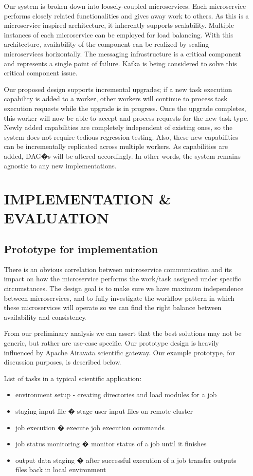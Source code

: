 \documentclass[sigconf]{acmart}
\begin{document}
Our system is broken down into loosely-coupled microservices. Each microservice performs closely related functionalities and gives away work to others. As this is a microservice inspired architecture, it inherently supports scalability. Multiple instances of each microservice can be employed for load balancing. With this architecture, availability of the component can be realized by scaling microservices horizontally. The messaging infrastructure is a critical component and represents a single point of failure. Kafka \cite{kafka2014high} is being considered to solve this critical component issue.

Our proposed design supports incremental upgrades; if a new task execution capability is added to a worker, other workers will continue to process task execution requests while the upgrade is in progress. Once the upgrade completes, this worker will now be able to accept and process requests for the new task type. Newly added capabilities are completely independent of existing ones, so the system does not require tedious regression testing. Also, these new capabilities can be incrementally replicated across multiple workers. As capabilities are added, DAG�s will be altered accordingly.  In other words, the system remains agnostic to any new implementations.

\section{IMPLEMENTATION \& EVALUATION}

\subsection{Prototype for implementation}
There is an obvious  correlation between microservice communication and its impact on how the microservice performs the work/task assigned under specific circumstances. The design goal is to make sure we have maximum independence between microservices, and to fully investigate the workflow pattern in which these microservices will operate so we can find the right balance between availability and consistency.

From our preliminary analysis we can assert that the best solutions may not be generic, but rather are use-case specific. Our prototype design is heavily influenced by Apache Airavata scientific gateway. Our example prototype, for discussion purposes, is described below.

List of tasks in a typical scientific application:
\begin{itemize}
\item environment setup - creating directories and load modules for a job
\item staging input file � stage user input files on remote cluster
\item job execution � execute job execution commands
\item job status monitoring � monitor status of a job until it finishes 
\item output data staging � after successful execution of a job transfer outputs files back in local environment
\end{itemize}
\end{document}
